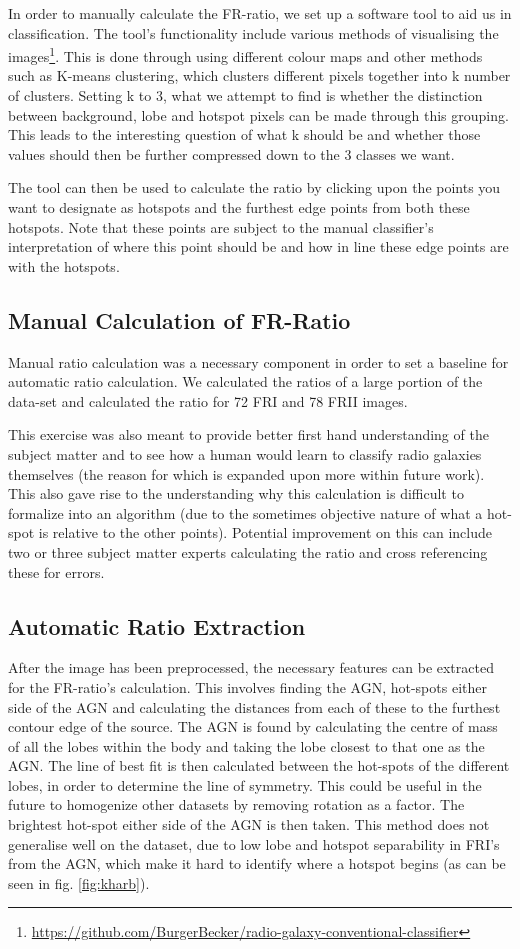 \documentclass[conference]{IEEEtran}
\begin{document}
In order to manually calculate the FR-ratio, we set up a software tool to aid us in classification. The tool's functionality include various methods of visualising the images\footnote{\url{https://github.com/BurgerBecker/radio-galaxy-conventional-classifier}}. This is done through using different colour maps  and other methods such as K-means clustering, which clusters different pixels together into k number of clusters. 
Setting k to 3, what we attempt to find is whether the distinction between background, lobe and hotspot pixels can be made through this grouping. This leads to the interesting question of what k should be and whether those values should then be further compressed down to the 3 classes we want.

The tool can then be used to calculate the ratio by clicking upon the points you want to designate as hotspots and the furthest edge points from both these hotspots. Note that these points are subject to the manual classifier's interpretation of where this point should be and how in line these edge points are with the hotspots.

\subsection{Manual Calculation of FR-Ratio}
Manual ratio calculation was a necessary component in order to set a baseline for automatic ratio calculation. We calculated the ratios of a large portion of the data-set and calculated the ratio for 72 FRI and 78 FRII images.

This exercise was also meant to provide better first hand understanding of the subject matter and to see how a human would learn to classify radio galaxies themselves (the reason for which is expanded upon more within future work). This also  gave rise to the understanding why this calculation is difficult to formalize into an algorithm (due to the sometimes objective nature of what a hot-spot is relative to the other points). Potential improvement on this can include two or three subject matter experts calculating the ratio and cross referencing these for errors.

\subsection{Automatic Ratio Extraction}
After the image has been preprocessed, the necessary features can be extracted for the FR-ratio's calculation. This involves finding the AGN, hot-spots either side of the AGN and calculating the distances from each of these to the furthest contour edge of the source. The AGN is found by calculating the centre of mass of all the lobes within the body and taking the lobe closest to that one as the AGN. The line of best fit is then calculated between the hot-spots of the different lobes, in order to determine the line of symmetry. This could be useful in the future to homogenize other datasets by removing rotation as a factor. The brightest hot-spot either side of the AGN is then taken. This method does not generalise well on the dataset, due to low lobe and hotspot separability in FRI's from the AGN, which make it hard to identify where a hotspot begins (as can be seen in fig. \ref{fig:kharb}).
\end{document}
